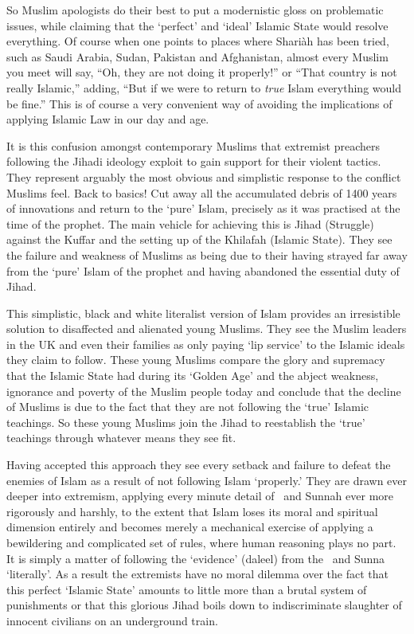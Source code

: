 \documentclass[12pt]{memoir}
\begin{document}
So Muslim apologists do their best to put a modernistic gloss
on problematic issues, while claiming
that the ‘perfect’ and ‘ideal’ Islamic State would resolve everything.
Of course when one points to places where Shari\`ah has been tried,
such as Saudi Arabia, Sudan, Pakistan and Afghanistan,
almost every Muslim you meet will say,
“Oh, they are not doing it properly!” or
“That country is not really Islamic,” adding,
“But if we were to return to \emph{true} Islam everything would be fine.”
This is of course a very convenient way of avoiding
the implications of applying Islamic Law in our day and age.

It is this confusion amongst contemporary Muslims
that extremist preachers following the Jihadi ideology
exploit to gain support for their violent tactics.
They represent arguably the most obvious and simplistic response
to the conflict Muslims feel.
Back to basics! Cut away all the accumulated debris of 1400 years
of innovations and return to the ‘pure’ Islam,
precisely as it was practised at the time of the prophet.
The main vehicle for achieving this is Jihad (Struggle)
against the Kuffar and the setting up of the Khilafah (Islamic State).
They see the failure and weakness of Muslims as being due to
their having strayed far away from the ‘pure’ Islam of the prophet
and having abandoned the essential duty of Jihad.

This simplistic, black and white literalist version of Islam provides
an irresistible solution to disaffected and alienated young Muslims.
They see the Muslim leaders in the UK and even their families
as only paying ‘lip service’ to the Islamic ideals they claim to follow.
These young Muslims compare the glory and supremacy
that the Islamic State had during its ‘Golden Age’
and the abject weakness, ignorance and poverty of the Muslim people today
and conclude that the decline of Muslims is due to the fact
that they are not following the ‘true’ Islamic teachings.
So these young Muslims join the Jihad to re\–establish
the ‘true’ teachings through whatever means they see fit.

Having accepted this approach they see every setback
and failure to defeat the enemies of Islam
as a result of not following Islam ‘properly.’
They are drawn ever deeper into extremism, applying every minute detail
of \Quran\ and Sunnah ever more rigorously and harshly,
to the extent that Islam loses its moral and spiritual dimension
entirely and becomes merely a mechanical exercise of applying a bewildering
and complicated set of rules, where human reasoning plays no part.
It is simply a matter of following the ‘evidence’ (daleel)
from the \Quran\ and Sunna ‘literally’.
As a result the extremists have no moral dilemma over the fact
that this perfect ‘Islamic State’ amounts to little more than
a brutal system of punishments or that this glorious Jihad boils down to
indiscriminate slaughter of innocent civilians on an underground train.
\end{document}
